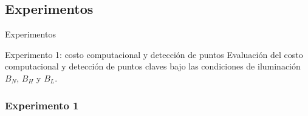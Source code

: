 \subsection{Experimentos}%
\begin{frame}{Experimentos}
  \begin{block}{Experimento 1: costo computacional y detección de puntos}
  Evaluación del costo computacional y detección de puntos claves bajo las condiciones de iluminación $B_{N}$, $B_{H}$ y $B_{L}$.
  \end{block}
\end{frame}
\subsubsection*{Experimento 1}
  \label{subsec:paraqumetros_utilizados}
  
